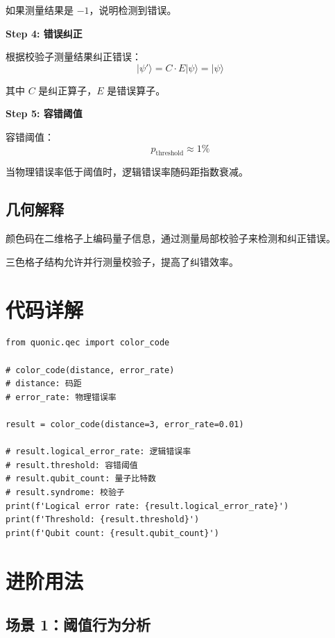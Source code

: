 \documentclass[12pt,a4paper]{article}
\begin{document}
如果测量结果是 $-1$，说明检测到错误。

\textbf{Step 4: 错误纠正}

根据校验子测量结果纠正错误：
\begin{equation}
|\psi'\rangle = C \cdot E |\psi\rangle = |\psi\rangle
\end{equation}

其中 $C$ 是纠正算子，$E$ 是错误算子。

\textbf{Step 5: 容错阈值}

容错阈值：
\begin{equation}
p_{\text{threshold}} \approx 1\%
\end{equation}

当物理错误率低于阈值时，逻辑错误率随码距指数衰减。

\subsection{几何解释}

颜色码在二维格子上编码量子信息，通过测量局部校验子来检测和纠正错误。

三色格子结构允许并行测量校验子，提高了纠错效率。

\section{代码详解}

\begin{verbatim}
from quonic.qec import color_code

# color_code(distance, error_rate)
# distance: 码距
# error_rate: 物理错误率

result = color_code(distance=3, error_rate=0.01)

# result.logical_error_rate: 逻辑错误率
# result.threshold: 容错阈值
# result.qubit_count: 量子比特数
# result.syndrome: 校验子
print(f'Logical error rate: {result.logical_error_rate}')
print(f'Threshold: {result.threshold}')
print(f'Qubit count: {result.qubit_count}')
\end{verbatim}

\section{进阶用法}

\subsection{场景 1：阈值行为分析}
\end{document}
